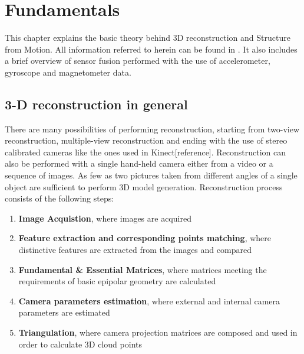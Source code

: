 \ifpdf
    \graphicspath{{figures/}{figures/comparisons}}
\else
    \graphicspath{{figures/}{figures/comparisons}}
\fi


\chapter{Fundamentals} %
This chapter explains the basic theory behind 3D reconstruction and Structure from Motion. All information referred to herein can be found in \cite{HartleyMultipleView}. It also includes a brief overview of sensor fusion performed with the use of accelerometer, gyroscope and magnetometer data. 

\section{3-D reconstruction in general}
There are many possibilities of performing reconstruction, starting from two-view reconstruction, multiple-view reconstruction and ending with the use of stereo calibrated cameras like the ones used in Kinect[reference]. Reconstruction can also be performed with a single hand-held camera either from a video or a sequence of images. As few as two pictures taken from different angles of a single object are sufficient to perform 3D model generation. Reconstruction process consists of the following steps:
\begin{enumerate}
\item \textbf{Image Acquistion}, where images are acquired 
\item \textbf{Feature extraction and corresponding points matching}, where distinctive features are extracted from the images and compared
\item \textbf{Fundamental \& Essential Matrices}, where matrices meeting the requirements of basic epipolar geometry are calculated
\item \textbf{Camera parameters estimation}, where external and internal camera parameters are estimated
\item \textbf{Triangulation}, where camera projection matrices are composed and used in order to calculate 3D cloud points
\end{enumerate}
